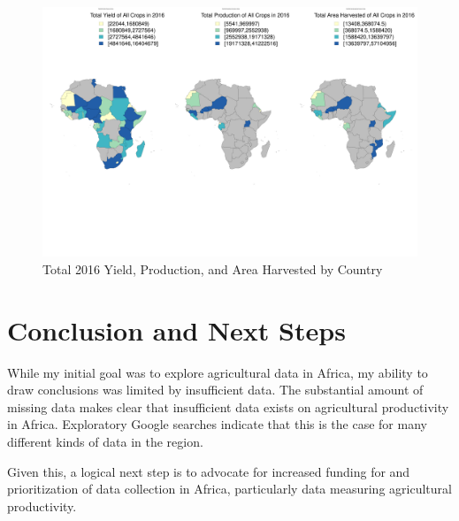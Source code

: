 \documentclass{article}
\begin{document}
\begin{figure}[h]
\centering
\includegraphics{EXEC_2-location}
\caption{Total 2016 Yield, Production, and Area Harvested by Country}
\label{region_maps}
\end{figure}

\section{Conclusion and Next Steps}\label{next steps}
While my initial goal was to explore agricultural data in Africa, my ability to draw conclusions was limited by insufficient data. The substantial amount of missing data makes clear that insufficient data exists on agricultural productivity in Africa. Exploratory Google searches indicate that this is the case for many different kinds of data in the region. 

Given this, a logical next step is to advocate for increased funding for and prioritization of data collection in Africa, particularly data measuring agricultural productivity. 
\end{document}
